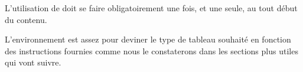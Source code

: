 \documentclass[10pt, a4paper]{article}
\begin{document}


\begin{tdocexa}
    \leavevmode

\end{tdocexa}




\begin{tdocwarn}
	L'utilisation de  doit se faire obligatoirement une fois, et une seule, au tout début du contenu.
\end{tdocwarn}




\begin{tdocnote}
	L'environnement  est assez  pour deviner le type de tableau souhaité en fonction des instructions fournies comme nous le constaterons dans les sections plus utiles qui vont suivre.
\end{tdocnote}
\end{document}

